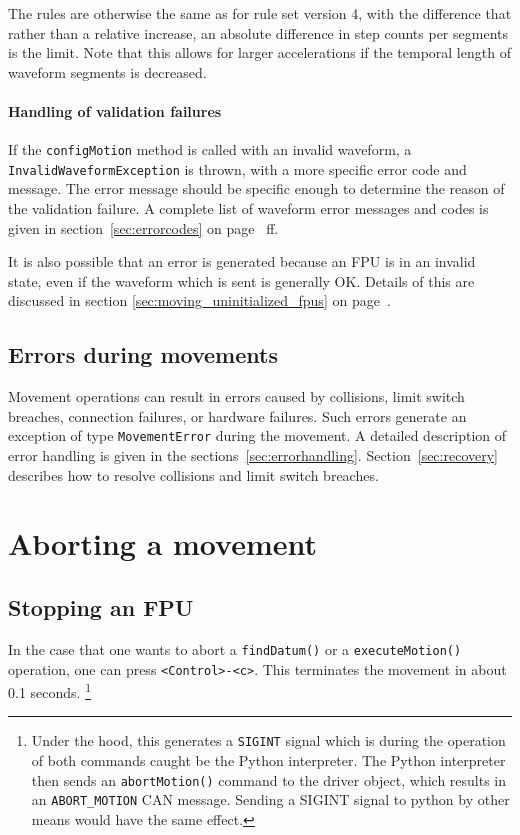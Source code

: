 \documentclass[fontsize=12,a4paper]{scrreprt}
\begin{document}
The rules are otherwise the same as for rule set version 4, with the
difference that rather than a relative increase, an absolute
difference in step counts per segments is the limit. Note that this
allows for larger accelerations if the temporal length of waveform
segments is decreased.




\paragraph{Handling of validation failures}

\begin{sloppypar}
If the \texttt{configMotion} method is called with an invalid
waveform, a \texttt{InvalidWaveformException} is thrown, with a more
specific error code and message. The error message should be specific
enough to determine the reason of the validation failure.  A complete
list of waveform error messages and codes is given in
section~\ref{sec:errorcodes} on page~\pageref{sec:errorcodes} ff.
\end{sloppypar}

It is also possible that an error is generated because an FPU
is in an invalid state, even if the waveform which is sent is
generally OK. Details of this are discussed in section \ref{sec:moving_uninitialized_fpus}
on page~\pageref{sec:moving_uninitialized_fpus}.

\subsection{Errors during movements}
Movement operations can result in errors caused by collisions, limit
switch breaches, connection failures, or hardware failures. Such
errors generate an exception of type \texttt{MovementError} during the
movement. A detailed description of error handling is given in the
sections~\ref{sec:errorhandling}. Section~\ref{sec:recovery} describes
how to resolve collisions and limit switch breaches.





\section{Aborting a movement}
%
%
%
\subsection{Stopping an FPU}
In the case that one wants to abort a \texttt{findDatum()} or a
\texttt{executeMotion()} operation, one can press
\verb+<Control>-<c>+. This terminates the movement in about 0.1
seconds. \footnote{Under the hood, this generates a \texttt{SIGINT}
  signal which is during the operation of both commands caught be the
  Python interpreter. The Python interpreter then sends an
  \texttt{abortMotion()} command to the driver object, which results
  in an \texttt{ABORT\_MOTION} CAN message. Sending a SIGINT signal to
  python by other means would have the same effect.}
\end{document}
